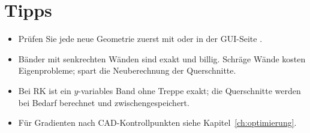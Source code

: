 \section{Tipps}
\begin{itemize}
  \item Prüfen Sie jede neue Geometrie zuerst mit  oder in der GUI-Seite .
  \item Bänder mit senkrechten Wänden sind exakt und billig. Schräge Wände kosten  Eigenprobleme;
         spart die Neuberechnung der Querschnitte.
  \item Bei RK ist ein $y$-variables Band ohne Treppe exakt; die Querschnitte werden bei Bedarf berechnet und
        zwischengespeichert.
  \item Für Gradienten nach CAD-Kontrollpunkten siehe Kapitel~\ref{ch:optimierung}.
\end{itemize}
